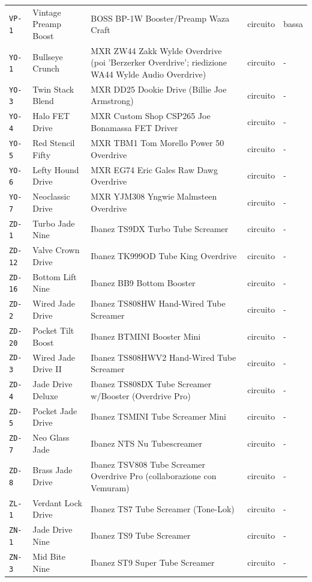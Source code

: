 \begin{xltabular}{\linewidth}{@{}l l X l l@{}}
\texttt{VP-1} & Vintage Preamp Boost & BOSS BP-1W Booster/Preamp Waza Craft & circuito & bassa\\
\texttt{YO-1} & Bullseye Crunch & MXR ZW44 Zakk Wylde Overdrive (poi 'Berzerker Overdrive'; riedizione WA44 Wylde Audio Overdrive) & circuito & -\\
\texttt{YO-3} & Twin Stack Blend & MXR DD25 Dookie Drive (Billie Joe Armstrong) & circuito & -\\
\texttt{YO-4} & Halo FET Drive & MXR Custom Shop CSP265 Joe Bonamassa FET Driver & circuito & -\\
\texttt{YO-5} & Red Stencil Fifty & MXR TBM1 Tom Morello Power 50 Overdrive & circuito & -\\
\texttt{YO-6} & Lefty Hound Drive & MXR EG74 Eric Gales Raw Dawg Overdrive & circuito & -\\
\texttt{YO-7} & Neoclassic Drive & MXR YJM308 Yngwie Malmsteen Overdrive & circuito & -\\
\texttt{ZD-1} & Turbo Jade Nine & Ibanez TS9DX Turbo Tube Screamer & circuito & -\\
\texttt{ZD-12} & Valve Crown Drive & Ibanez TK999OD Tube King Overdrive & circuito & -\\
\texttt{ZD-16} & Bottom Lift Nine & Ibanez BB9 Bottom Booster & circuito & -\\
\texttt{ZD-2} & Wired Jade Drive & Ibanez TS808HW Hand-Wired Tube Screamer & circuito & -\\
\texttt{ZD-20} & Pocket Tilt Boost & Ibanez BTMINI Booster Mini & circuito & -\\
\texttt{ZD-3} & Wired Jade Drive II & Ibanez TS808HWV2 Hand-Wired Tube Screamer & circuito & -\\
\texttt{ZD-4} & Jade Drive Deluxe & Ibanez TS808DX Tube Screamer w/Booster (Overdrive Pro) & circuito & -\\
\texttt{ZD-5} & Pocket Jade Drive & Ibanez TSMINI Tube Screamer Mini & circuito & -\\
\texttt{ZD-7} & Neo Glass Jade & Ibanez NTS Nu Tubescreamer & circuito & -\\
\texttt{ZD-8} & Brass Jade Drive & Ibanez TSV808 Tube Screamer Overdrive Pro (collaborazione con Vemuram) & circuito & -\\
\texttt{ZL-1} & Verdant Lock Drive & Ibanez TS7 Tube Screamer (Tone-Lok) & circuito & -\\
\texttt{ZN-1} & Jade Drive Nine & Ibanez TS9 Tube Screamer & circuito & -\\
\texttt{ZN-3} & Mid Bite Nine & Ibanez ST9 Super Tube Screamer & circuito & -\\

\end{xltabular}
